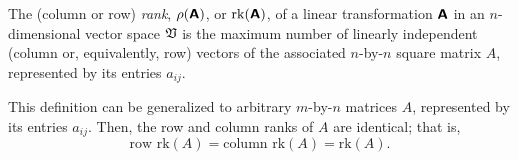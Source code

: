 The (column or row) {\em rank}, $\rho (  \textsf{\textbf{A}}  )$,
or $\textrm{rk} ( \textsf{\textbf{A}} )$,
of a linear transformation $ \textsf{\textbf{A}} $
in an $n$-dimensional vector space ${\frak V}$
is the maximum number of linearly independent (column or, equivalently,
row) vectors of the associated
$n$-by-$n$ square matrix $ A $, represented by its entries  $a_{ij}$.

This definition can be generalized to arbitrary
$m$-by-$n$ matrices $A$, represented by its entries  $a_{ij}$.
Then, the row and column ranks of $A$ are identical; that is,
\begin{equation}
\textrm{row rk} (A) =
\textrm{column rk} (A)  =
\textrm{rk} (A).
\end{equation}


